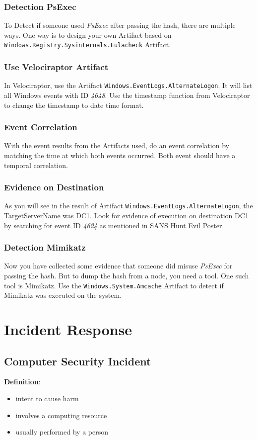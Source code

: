 \subsubsection{Detection PsExec}
To Detect if someone used \textit{PsExec} after passing the hash, there are multiple ways. One way is to design your own Artifact based on \lstinline|Windows.Registry.Sysinternals.Eulacheck| Artifact.

\subsubsection{Use Velociraptor Artifact}
In Velociraptor, use the Artifact \lstinline|Windows.EventLogs.AlternateLogon|. It will list all Windows events with ID \textit{4648}. Use the timestamp function from Velociraptor to change the timestamp to date time format.

\subsubsection{Event Correlation}
With the event results from the Artifacts used, do an event correlation by matching the time at which both events occurred. Both event should have a temporal correlation.

\subsubsection{Evidence on Destination}
As you will see in the result of Artifact \lstinline|Windows.EventLogs.AlternateLogon|, the TargetServerName was DC1. Look for evidence of execution on destination DC1 by searching for event ID \textit{4624} as mentioned in SANS Hunt Evil Poster.

\subsubsection{Detection Mimikatz}
Now you have collected some evidence that someone did misuse \textit{PsExec} for passing the hash. But to dump the hash from a node, you need a tool. One such tool is Mimikatz. Use the \lstinline|Windows.System.Amcache| Artifact to detect if Mimikatz was executed on the system.

\newpage

\section{Incident Response}

\subsection{Computer Security Incident}
\textbf{Definition}:
\begin{itemize}
    \item intent to cause harm
    \item involves a computing resource
    \item usually performed by a person\\
\end{itemize}

